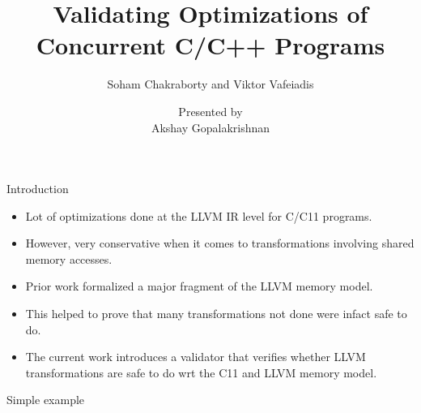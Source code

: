 \documentclass[xcolor=dvipsnames, notes]{beamer}
\title{Validating Optimizations of Concurrent C/C++ Programs}
\subtitle{Soham Chakraborty and Viktor Vafeiadis}
\author{Presented by \\ Akshay Gopalakrishnan}
\begin{document}
    \begin{frame}

        \maketitle

    \end{frame}

    \begin{frame}{Introduction}
        
        \begin{itemize}
            \item Lot of optimizations done at the LLVM IR level for C/C11 programs.
            \item However, very conservative when it comes to transformations involving shared memory accesses.
            \item Prior work formalized a major fragment of the LLVM memory model.
            \item This helped to prove that many transformations not done were infact safe to do.
            \item The current work introduces a validator that verifies whether LLVM transformations are safe to do wrt the C11 and LLVM memory model.
        \end{itemize}
        
    \end{frame}

    \begin{frame}{Simple example}

        \begin{figure}
        \end{figure}
    \end{frame}
\end{document}
